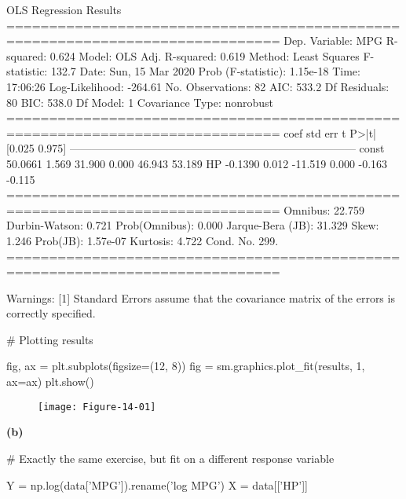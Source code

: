 \begin{console}
                            OLS Regression Results
==============================================================================
Dep. Variable:                    MPG   R-squared:                       0.624
Model:                            OLS   Adj. R-squared:                  0.619
Method:                 Least Squares   F-statistic:                     132.7
Date:                Sun, 15 Mar 2020   Prob (F-statistic):           1.15e-18
Time:                        17:06:26   Log-Likelihood:                -264.61
No. Observations:                  82   AIC:                             533.2
Df Residuals:                      80   BIC:                             538.0
Df Model:                           1
Covariance Type:            nonrobust
==============================================================================
                 coef    std err          t      P>|t|      [0.025      0.975]
------------------------------------------------------------------------------
const         50.0661      1.569     31.900      0.000      46.943      53.189
HP            -0.1390      0.012    -11.519      0.000      -0.163      -0.115
==============================================================================
Omnibus:                       22.759   Durbin-Watson:                   0.721
Prob(Omnibus):                  0.000   Jarque-Bera (JB):               31.329
Skew:                           1.246   Prob(JB):                     1.57e-07
Kurtosis:                       4.722   Cond. No.                         299.
==============================================================================

Warnings:
[1] Standard Errors assume that the covariance matrix of the errors is correctly
specified.
\end{console}

\begin{python}
# Plotting results

fig, ax = plt.subplots(figsize=(12, 8))
fig = sm.graphics.plot_fit(results, 1, ax=ax)
plt.show()
\end{python}

\begin{figure}[H]
\centering
\texttt{[image: Figure-14-01]}
\end{figure}

\textbf{(b)}

\begin{python}
# Exactly the same exercise, but fit on a different response variable

Y = np.log(data['MPG']).rename('log MPG')
X = data[['HP']]
\end{python}

